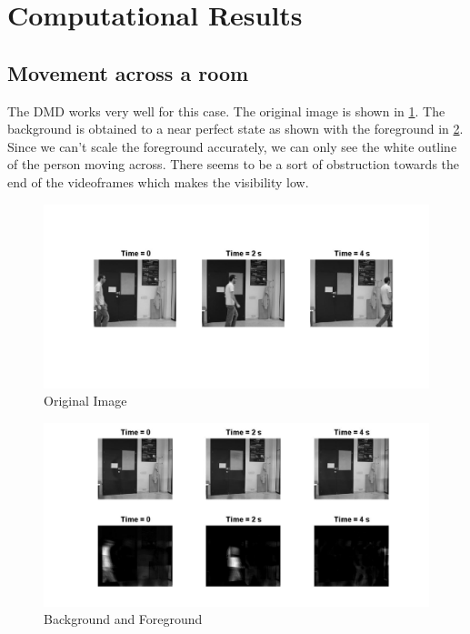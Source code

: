 \documentclass[a4paper]{article}
\begin{document}
\section{Computational Results}

\subsection{Movement across a room}

The DMD works very well for this case. The original image is shown in \ref{F:Im11}. The background is obtained to a near perfect state as shown with the foreground in \ref{F:Im111}. Since we can't scale the foreground accurately, we can only see the white outline of the person moving across. There seems to be a sort of obstruction towards the end of the videoframes which makes the visibility low. 

\begin{figure}[h] 
	\begin{centering} 
			\includegraphics[width=1.1\textwidth]{Im11}
 	\end{centering}
			\caption{Original Image \label{F:Im11}}	
\end{figure}

\begin{figure}[h!] 
	\begin{centering} 
		\includegraphics[width=1.1\textwidth]{Image11}
	\end{centering}
	\caption{Background and Foreground \label{F:Im111}}	
\end{figure}
\end{document}
